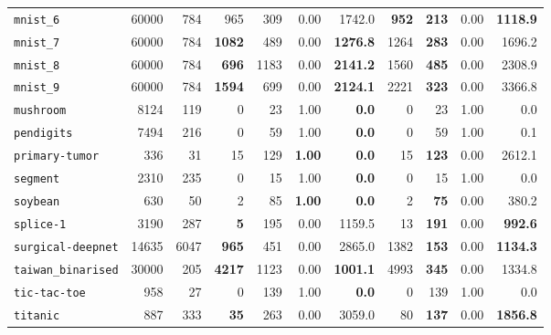 \begin{tabular}{lccrrrrrrrr}
\texttt{mnist\_6} & \multicolumn{1}{r}{60000} & \multicolumn{1}{r}{784}  & 965 & 309 & 0.00 & 1742.0 & \textbf{952} & \textbf{213} & 0.00 & \textbf{1118.9}\\
\texttt{mnist\_7} & \multicolumn{1}{r}{60000} & \multicolumn{1}{r}{784}  & \textbf{1082} & 489 & 0.00 & \textbf{1276.8} & 1264 & \textbf{283} & 0.00 & 1696.2\\
\texttt{mnist\_8} & \multicolumn{1}{r}{60000} & \multicolumn{1}{r}{784}  & \textbf{696} & 1183 & 0.00 & \textbf{2141.2} & 1560 & \textbf{485} & 0.00 & 2308.9\\
\texttt{mnist\_9} & \multicolumn{1}{r}{60000} & \multicolumn{1}{r}{784}  & \textbf{1594} & 699 & 0.00 & \textbf{2124.1} & 2221 & \textbf{323} & 0.00 & 3366.8\\
\texttt{mushroom} & \multicolumn{1}{r}{8124} & \multicolumn{1}{r}{119}  & 0 & 23 & 1.00 & \textbf{0.0} & 0 & 23 & 1.00 & 0.0\\
\texttt{pendigits} & \multicolumn{1}{r}{7494} & \multicolumn{1}{r}{216}  & 0 & 59 & 1.00 & \textbf{0.0} & 0 & 59 & 1.00 & 0.1\\
\texttt{primary-tumor} & \multicolumn{1}{r}{336} & \multicolumn{1}{r}{31}  & 15 & 129 & \textbf{1.00} & \textbf{0.0} & 15 & \textbf{123} & 0.00 & 2612.1\\
\texttt{segment} & \multicolumn{1}{r}{2310} & \multicolumn{1}{r}{235}  & 0 & 15 & 1.00 & \textbf{0.0} & 0 & 15 & 1.00 & 0.0\\
\texttt{soybean} & \multicolumn{1}{r}{630} & \multicolumn{1}{r}{50}  & 2 & 85 & \textbf{1.00} & \textbf{0.0} & 2 & \textbf{75} & 0.00 & 380.2\\
\texttt{splice-1} & \multicolumn{1}{r}{3190} & \multicolumn{1}{r}{287}  & \textbf{5} & 195 & 0.00 & 1159.5 & 13 & \textbf{191} & 0.00 & \textbf{992.6}\\
\texttt{surgical-deepnet} & \multicolumn{1}{r}{14635} & \multicolumn{1}{r}{6047}  & \textbf{965} & 451 & 0.00 & 2865.0 & 1382 & \textbf{153} & 0.00 & \textbf{1134.3}\\
\texttt{taiwan\_binarised} & \multicolumn{1}{r}{30000} & \multicolumn{1}{r}{205}  & \textbf{4217} & 1123 & 0.00 & \textbf{1001.1} & 4993 & \textbf{345} & 0.00 & 1334.8\\
\texttt{tic-tac-toe} & \multicolumn{1}{r}{958} & \multicolumn{1}{r}{27}  & 0 & 139 & 1.00 & \textbf{0.0} & 0 & 139 & 1.00 & 0.0\\
\texttt{titanic} & \multicolumn{1}{r}{887} & \multicolumn{1}{r}{333}  & \textbf{35} & 263 & 0.00 & 3059.0 & 80 & \textbf{137} & 0.00 & \textbf{1856.8}\\

\end{tabular}
